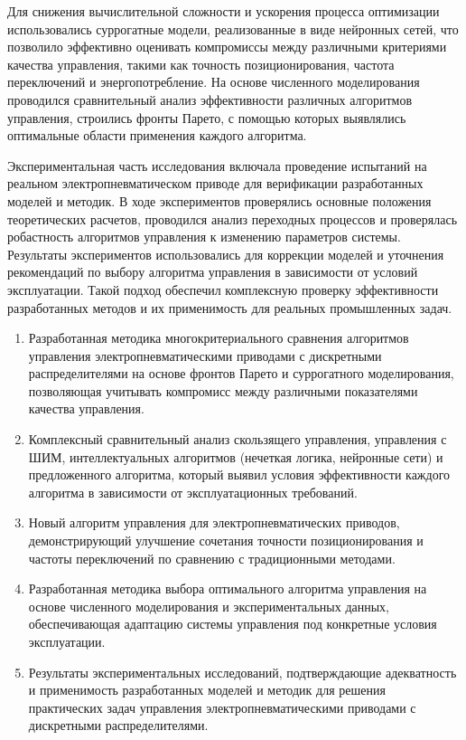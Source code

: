 Для снижения вычислительной сложности и ускорения процесса оптимизации использовались суррогатные модели, реализованные
в виде нейронных сетей, что позволило эффективно оценивать компромиссы между различными критериями качества управления,
такими как точность позиционирования, частота переключений и энергопотребление. На основе численного моделирования проводился
сравнительный анализ эффективности различных алгоритмов управления, строились фронты Парето, с помощью которых выявлялись
оптимальные области применения каждого алгоритма.

Экспериментальная часть исследования включала проведение испытаний на реальном электропневматическом приводе для верификации
разработанных моделей и методик. В ходе экспериментов проверялись основные положения теоретических расчетов, проводился
анализ переходных процессов и проверялась робастность алгоритмов управления к изменению параметров системы. Результаты
экспериментов использовались для коррекции моделей и уточнения рекомендаций по
выбору алгоритма управления в зависимости от условий эксплуатации. Такой подход обеспечил комплексную проверку
эффективности разработанных методов и их применимость для реальных промышленных задач.

{}
\begin{enumerate}[beginpenalty=10000] %
    \item Разработанная методика многокритериального сравнения алгоритмов управления
    электропневматическими приводами с дискретными распределителями на основе фронтов Парето и
    суррогатного моделирования, позволяющая учитывать компромисс между различными показателями качества управления.
    \item Комплексный сравнительный анализ скользящего управления, управления с ШИМ, интеллектуальных
    алгоритмов (нечеткая логика, нейронные сети) и предложенного алгоритма, который выявил условия
    эффективности каждого алгоритма в зависимости от эксплуатационных требований.
    \item Новый алгоритм управления для электропневматических приводов, демонстрирующий улучшение сочетания
    точности позиционирования и частоты переключений по сравнению с традиционными методами.
    \item Разработанная методика выбора оптимального алгоритма управления на основе численного моделирования
    и экспериментальных данных, обеспечивающая адаптацию системы управления под конкретные условия эксплуатации.
    \item Результаты экспериментальных исследований, подтверждающие адекватность и применимость разработанных
    моделей и методик для решения практических задач управления электропневматическими приводами с дискретными распределителями.
\end{enumerate}


